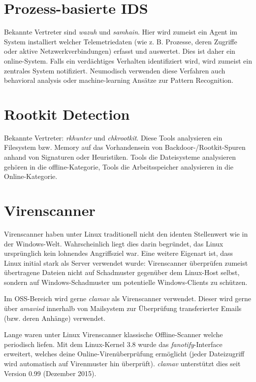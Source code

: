 \section{Prozess-basierte IDS}

Bekannte Vertreter sind \textit{wazuh} und \textit{samhain}. Hier wird zumeist ein Agent im System installiert welcher Telemetriedaten (wie z. B. Prozesse, deren Zugriffe oder aktive Netzwerkverbindungen) erfasst und auswertet. Dies ist daher ein online-System. Falls ein verdächtiges Verhalten identifiziert wird, wird zumeist ein zentrales System notifiziert. Neumodisch verwenden diese Verfahren auch behavioral analysis oder machine-learning Ansätze zur Pattern Recognition.

\section{Rootkit Detection}

Bekannte Vertreter: \textit{rkhunter} und \textit{chkrootkit}. Diese Tools analysieren ein Filesystem bzw. Memory auf das Vorhandensein von Backdoor-/Rootkit-Spuren anhand von Signaturen oder Heuristiken. Tools die Dateisysteme analysieren gehören in die offline-Kategorie, Tools die Arbeitsspeicher analysieren in die Online-Kategorie.

\section{Virenscanner}

Virenscanner haben unter Linux traditionell nicht den identen Stellenwert wie in der Windows-Welt. Wahrscheinlich liegt dies darin begründet, das Linux ursprünglich kein lohnendes Angriffsziel war. Eine weitere Eigenart ist, dass Linux initial stark als Server verwendet wurde: Virenscanner überprüfen zumeist übertragene Dateien nicht auf Schadmuster gegenüber dem Linux-Host selbst, sondern auf Windows-Schadmuster um potentielle Windows-Clients zu schützen.

Im OSS-Bereich wird gerne \textit{clamav} als Virenscanner verwendet. Dieser wird gerne über \textit{amavisd} innerhalb von Mailsystem zur Überprüfung transferierter Emails (bzw. deren Anhänge) verwendet.

Lange waren unter Linux Virenscanner klassische Offline-Scanner welche periodisch liefen. Mit dem Linux-Kernel 3.8 wurde das \textit{fanotify}-Interface erweitert, welches deine Online-Virenüberprüfung ermöglicht (jeder Dateizugriff wird automatisch auf Virenmuster hin überprüft). \textit{clamav} unterstützt dies seit Version 0.99 (Dezember 2015).

